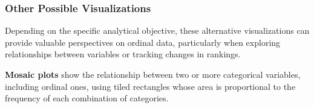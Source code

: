 \documentclass[
  letterpaper,
  DIV=11,
  numbers=noendperiod]{scrartcl}
\begin{document}
\hypertarget{other-possible-visualizations}{%
\subsubsection*{Other Possible
Visualizations}\label{other-possible-visualizations}}

Depending on the specific analytical objective, these alternative
visualizations can provide valuable perspectives on ordinal data,
particularly when exploring relationships between variables or tracking
changes in rankings.

\textbf{Mosaic plots} show the relationship between two or more
categorical variables, including ordinal ones, using tiled rectangles
whose area is proportional to the frequency of each combination of
categories.
\end{document}
